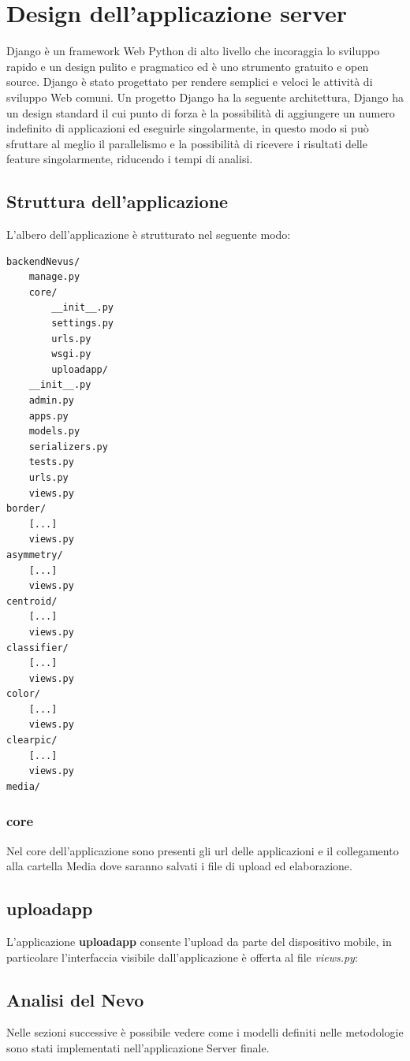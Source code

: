 {\section{Design dell'applicazione server}
Django è un framework Web Python di alto livello che incoraggia lo sviluppo rapido e un design pulito e pragmatico ed è uno strumento gratuito e open source.
\newline
Django è stato progettato per rendere semplici e veloci le attività di sviluppo Web comuni.
Un progetto Django ha la seguente architettura,
Django ha un design standard il cui punto di forza è la possibilità di aggiungere un numero indefinito di applicazioni ed eseguirle singolarmente, in questo modo si può sfruttare al meglio il parallelismo e la possibilità di ricevere i risultati delle feature singolarmente, riducendo i tempi di analisi.
\newpage
\subsection{Struttura dell'applicazione}
L'albero dell'applicazione è strutturato nel seguente modo:
\begin{lstlisting}
backendNevus/
	manage.py
	core/
		__init__.py
		settings.py
		urls.py
		wsgi.py
		uploadapp/
	__init__.py
	admin.py
	apps.py
	models.py
	serializers.py
	tests.py
	urls.py
	views.py
border/
	[...]
	views.py
asymmetry/
	[...]
	views.py
centroid/
	[...]
	views.py
classifier/
	[...]
	views.py
color/
	[...]
	views.py
clearpic/
	[...]
	views.py
media/
\end{lstlisting}

\subsubsection{core}
Nel core dell'applicazione sono presenti gli url delle applicazioni e il collegamento alla cartella Media dove saranno salvati i file di upload ed elaborazione.
\subsection{uploadapp}
L'applicazione \textbf{uploadapp} consente l'upload da parte del dispositivo mobile, in particolare l'interfaccia visibile dall'applicazione è offerta al file \textit{views.py}:
\newpage
\subsection{Analisi del Nevo}
Nelle sezioni successive è possibile vedere come i modelli definiti nelle metodologie sono stati implementati nell'applicazione Server finale.
\newline
}
